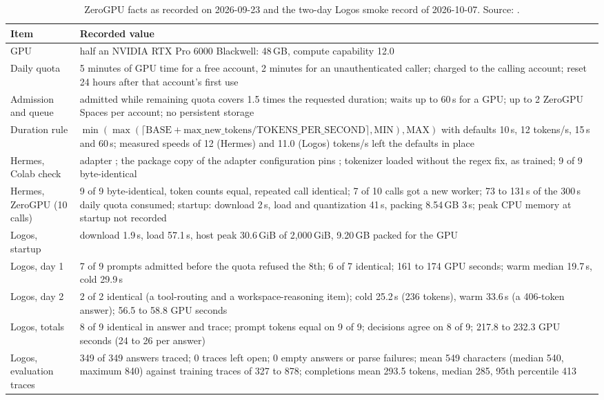 \begin{table}[H]
\centering\small
\caption{ZeroGPU facts as recorded on 2026-09-23 and the two-day Logos smoke record of 2026-10-07. Source: .}
\label{tab:zerogpu}
\begin{tabular}{L{50mm}L{102mm}}
\toprule
Item & Recorded value \\
\midrule
GPU & half an NVIDIA RTX Pro 6000 Blackwell: 48\,GB, compute capability 12.0 \\
Daily quota & 5 minutes of GPU time for a free account, 2 minutes for an unauthenticated caller; charged to the calling account; reset 24 hours after that account's first use \\
Admission and queue & admitted while remaining quota covers 1.5 times the requested duration; waits up to 60\,s for a GPU; up to 2 ZeroGPU Spaces per account; no persistent storage \\
Duration rule & $\min(\max(\lceil \text{BASE} + \text{max\_new\_tokens}/\text{TOKENS\_PER\_SECOND} \rceil, \text{MIN}), \text{MAX})$ with defaults 10\,s, 12 tokens/s, 15\,s and 60\,s; measured speeds of 12 (Hermes) and 11.0 (Logos) tokens/s left the defaults in place \\
Hermes, Colab check & adapter ; the package copy of the adapter configuration pins ; tokenizer loaded without the regex fix, as trained; 9 of 9 byte-identical \\
Hermes, ZeroGPU (10 calls) & 9 of 9 byte-identical, token counts equal, repeated call identical; 7 of 10 calls got a new worker; 73 to 131\,s of the 300\,s daily quota consumed; startup: download 2\,s, load and quantization 41\,s, packing 8.54\,GB 3\,s; peak CPU memory at startup not recorded \\
Logos, startup & download 1.9\,s, load 57.1\,s, host peak 30.6\,GiB of 2,000\,GiB, 9.20\,GB packed for the GPU \\
Logos, day 1 & 7 of 9 prompts admitted before the quota refused the 8th; 6 of 7 identical; 161 to 174 GPU seconds; warm median 19.7\,s, cold 29.9\,s \\
Logos, day 2 & 2 of 2 identical (a tool-routing and a workspace-reasoning item); cold 25.2\,s (236 tokens), warm 33.6\,s (a 406-token answer); 56.5 to 58.8 GPU seconds \\
Logos, totals & 8 of 9 identical in answer and trace; prompt tokens equal on 9 of 9; decisions agree on 8 of 9; 217.8 to 232.3 GPU seconds (24 to 26 per answer) \\
Logos, evaluation traces & 349 of 349 answers traced; 0 traces left open; 0 empty answers or parse failures; mean 549 characters (median 540, maximum 840) against training traces of 327 to 878; completions mean 293.5 tokens, median 285, 95th percentile 413 \\
\bottomrule
\end{tabular}
\end{table}

